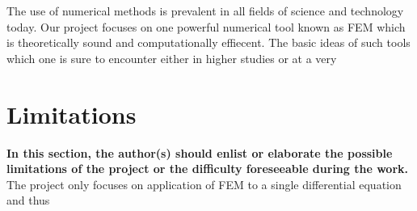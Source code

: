 The use of numerical methods is prevalent in all fields of science and technology today. Our project focuses on one powerful numerical tool known as FEM which is theoretically sound and computationally effiecent. The basic ideas of such tools which one is sure to encounter either in higher studies or at a very 

\section{\bf Limitations}
{\bf\color{red}In this section, the author(s) should enlist or elaborate the possible limitations of the project or the difficulty foreseeable during the work.}
The project only focuses on application of FEM to a single differential equation and thus 
